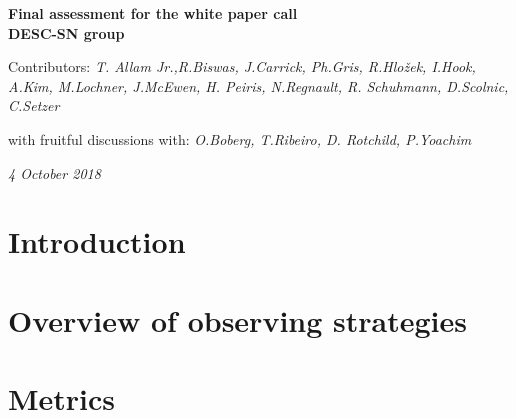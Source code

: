 \documentclass [11pt,a4paper]{article}
\begin{document}
\renewcommand\appendix{\par
  \setcounter{section}{0}
  \setcounter{subsection}{0}
  \setcounter{figure}{0}
  \setcounter{table}{0}
  \renewcommand\thesection{Appendix} %
  \renewcommand\thefigure{\Alph{section}\arabic{figure}}
  \renewcommand\thetable{\Alph{section}\arabic{table}} 
}

\begin{titlepage}
   \begin{center}
      \Large\textbf{Final assessment for the white paper call}\\
        \vspace*{0.5cm}
      \Large\textbf{DESC-SN group} \\
      
		  \vspace*{0.5cm}

      \large Contributors: \large\textit{T. Allam Jr.,R.Biswas, J.Carrick, Ph.Gris, R.Hlo\v{z}ek, I.Hook, A.Kim, M.Lochner, J.McEwen, H. Peiris, N.Regnault, R. Schuhmann, D.Scolnic, C.Setzer} \\
	\vspace*{0.25cm}

    \large with fruitful discussions with: \large\textit{O.Boberg, T.Ribeiro, D. Rotchild, P.Yoachim} \\
	\vspace*{0.5cm}

      \large\textit{4 October 2018}
   \end{center}
\end{titlepage}


\tableofcontents


\section{Introduction}




\section{Overview of observing strategies}




\section{Metrics}
\end{document}
